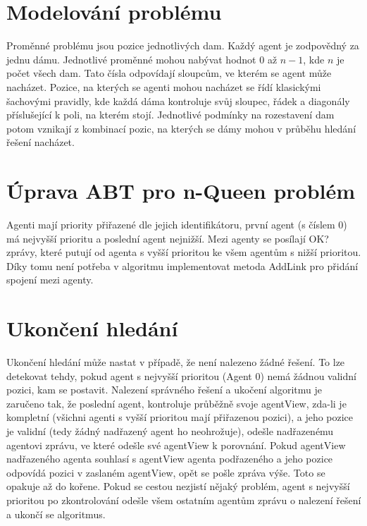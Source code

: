 \section{Modelování problému}

Proměnné problému jsou pozice jednotlivých dam. Každý agent je zodpovědný za jednu dámu. Jednotlivé proměnné mohou nabývat hodnot \( 0 \) až \( n - 1 \), kde \( n \) je počet všech dam. Tato čísla odpovídají sloupcům, ve kterém se agent může nacházet. Pozice, na kterých se agenti mohou nacházet se řídí klasickými šachovými pravidly, kde každá dáma kontroluje svůj sloupec, řádek a diagonály příslušející k poli, na kterém stojí. Jednotlivé podmínky na rozestavení dam potom vznikají z kombinací pozic, na kterých se dámy mohou v průběhu hledání řešení nacházet.

\section{Úprava ABT pro n-Queen problém}

Agenti mají priority přiřazené dle jejich identifikátoru, první agent (s číslem 0) má nejvyšší prioritu a poslední agent nejnižší. Mezi agenty se posílají OK? zprávy, které putují od agenta s vyšší prioritou ke všem agentům s nižší prioritou. Díky tomu není potřeba v algoritmu implementovat metoda AddLink pro přidání spojení mezi agenty.

\section{Ukončení hledání}

Ukončení hledání může nastat v případě, že není nalezeno žádné řešení. To lze detekovat tehdy, pokud agent s nejvyšší prioritou (Agent 0) nemá žádnou validní pozici, kam se postavit. Nalezení správného řešení a ukočení algoritmu je zaručeno tak, že poslední agent, kontroluje průběžně svoje agentView, zda-li je kompletní (všichni agenti s vyšší prioritou mají přiřazenou pozici), a jeho pozice je validní (tedy žádný nadřazený agent ho neohrožuje), odešle nadřazenému agentovi zprávu, ve které odešle své agentView k porovnání. Pokud agentView nadřazeného agenta souhlasí s agentView agenta podřazeného a jeho pozice odpovídá pozici v zaslaném agentView, opět se pošle zpráva výše. Toto se opakuje až do kořene. Pokud se cestou nezjistí nějaký problém, agent s nejvyšší prioritou po zkontrolování odešle všem ostatním agentům zprávu o nalezení řešení a ukončí se algoritmus.
